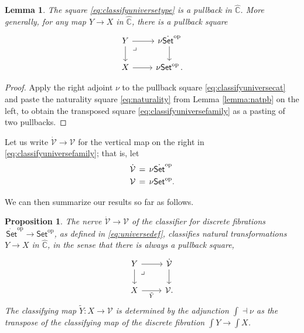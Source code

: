 \documentclass[11pt]{article}
\newcommand{\C}{\ensuremath{\mathbb{C}}}
\newcommand{\op}[1]{\ensuremath{{#1}^{\mathrm{op}}}}
\newcommand{\Set}{\ensuremath{\mathsf{Set}}}
\newcommand{\ra}{\ensuremath{\rightarrow}}
\renewcommand{\to}{\ensuremath{\rightarrow}}
\newcommand{\SSet}{\ensuremath{\,\dot{\Set}}}
\newcommand{\V}{\ensuremath{\mathcal{V}}}
\newcommand{\VV}{\ensuremath{\dot{\mathcal{V}}}}
\newcommand{\elem}[1]{\textstyle\int\!{#1}}
\newcommand{\pbmark}{\ar[dr, phantom, "\lrcorner" very near start, shift right=.5ex]}	%
\newtheorem{proposition}[theorem]{Proposition}
\newtheorem{lemma}[theorem]{Lemma}
\theoremstyle{remark}
\theoremstyle{definition}
\begin{document}
\begin{lemma}
The square \eqref{eq:classifyuniversetype} is a pullback in $\widehat{\C}$. More generally, for any map $Y\ra X$ in $\widehat{\C}$, there is a pullback square 
\begin{equation}\label{eq:classifyuniversefamily}\textstyle
\begin{tikzcd}
	 Y \ar[d] \pbmark \ar[r] & \nu\op{\dot{\Set}} \ar[d] \\  
	X \ar[r] &  \nu\op{\Set}\,.
 \end{tikzcd}
 \end{equation}
\end{lemma}

\begin{proof}
Apply the right adjoint $\nu$ to the pullback square \eqref{eq:classifyuniversecat} and paste the naturality square \eqref{eq:naturality} from Lemma \ref{lemma:natpb} on the left, to obtain the transposed square \eqref{eq:classifyuniversefamily} as a pasting of two pullbacks.
\end{proof}

Let us write $\VV \to \V$ for the vertical map on the right in \eqref{eq:classifyuniversefamily};  that is, let
\begin{align}\label{eq:universedef}\textstyle
\VV\, &=\, \nu\op{\dot{\Set}}\\  
\V\, &=\, \nu\op{\Set}.\notag
 \end{align}
 
 We can then summarize our results so far as follows.

 \begin{proposition}\label{prop:Vclassifies}
The nerve $\VV\to\V$  of the classifier for discrete fibrations $\op\SSet\to\op\Set$, as defined in \eqref{eq:universedef}, classifies natural transformations $Y\to X$ in $\widehat{\C}$, in the sense that there is always a pullback square,
\begin{equation}\label{eq:classifyuniversefamily2}\textstyle
\begin{tikzcd}
	 Y \ar[d] \pbmark \ar[r] & \VV \ar[d] \\  
	X \ar[r,swap, "\tilde{Y} "] &  \V.
 \end{tikzcd}
 \end{equation}
The classifying map $\tilde{Y} : X\to \V$ is determined by the adjunction $\int \dashv \nu$ as the transpose of the classifying map of the discrete fibration $\elem Y\to\elem X$.  
\end{proposition}
\end{document}
